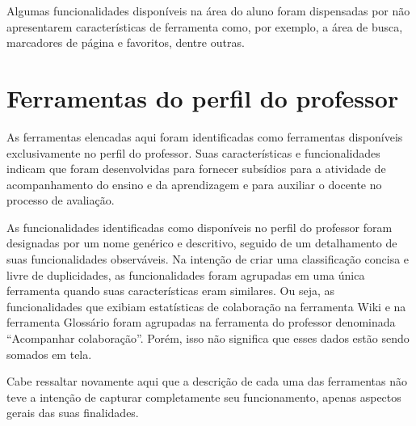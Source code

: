 Algumas funcionalidades disponíveis na área do aluno foram dispensadas por não apresentarem características de ferramenta como, por exemplo, a área de busca, marcadores de página e favoritos, dentre outras. 
\section{Ferramentas do perfil do professor}%
\label{sec:aval}
As ferramentas elencadas aqui foram identificadas como ferramentas disponíveis exclusivamente no perfil do professor. Suas características e funcionalidades indicam que foram desenvolvidas para fornecer subsídios para a atividade de acompanhamento do ensino e da aprendizagem e para auxiliar o docente no processo de avaliação.

As funcionalidades identificadas como disponíveis no perfil do professor foram designadas por um nome genérico e descritivo, seguido de um detalhamento de suas funcionalidades observáveis. Na intenção de criar uma classificação concisa e livre de duplicidades, as funcionalidades foram agrupadas em uma única ferramenta quando suas características eram similares. Ou seja, as funcionalidades que exibiam estatísticas de colaboração na ferramenta Wiki e na ferramenta Glossário foram agrupadas na ferramenta do professor denominada ``Acompanhar colaboração''. Porém, isso não significa que esses dados estão sendo somados em tela.

Cabe ressaltar novamente aqui que a descrição de cada uma das ferramentas não teve a intenção de capturar completamente seu funcionamento, apenas aspectos gerais das suas finalidades.

